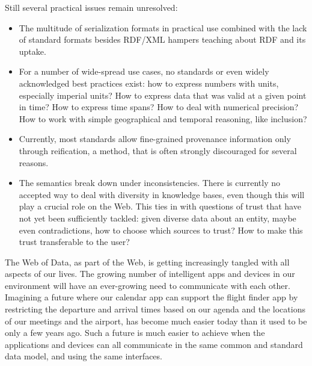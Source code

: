 Still several practical issues remain unresolved:
\begin{itemize}
\item The multitude of serialization formats in practical use combined with the lack of standard formats besides RDF/XML hampers teaching about RDF and its uptake.
\item For a number of wide-spread use cases, no standards or even widely acknowledged best practices exist: how to express numbers with units, especially imperial units? How to express data that was valid at a given point in time? How to express time spans? How to deal with numerical precision? How to work with simple geographical and temporal reasoning, like inclusion?
\item Currently, most standards allow fine-grained provenance information only through reification, a method, that is often strongly discouraged for several reasons.
\item The semantics break down under inconsistencies. There is currently no accepted way to deal with diversity in knowledge bases, even though this will play a crucial role on the Web. This ties in with questions of trust that have not yet been sufficiently tackled: given diverse data about an entity, maybe even contradictions, how to choose which sources to trust? How to make this trust transferable to the user?
\end{itemize}

The Web of Data, as part of the Web, is getting increasingly tangled with all aspects of our lives.
The growing number of intelligent apps and devices in our environment will have an ever-growing need to communicate with each other.
Imagining a future where our calendar app can support the flight finder app by restricting the departure and arrival times based on our agenda and the locations of our meetings and the airport, has become much easier today than it used to be only a few years ago.
Such a future is much easier to achieve when the applications and devices can all communicate in the same common and standard data model, and using the same interfaces.

